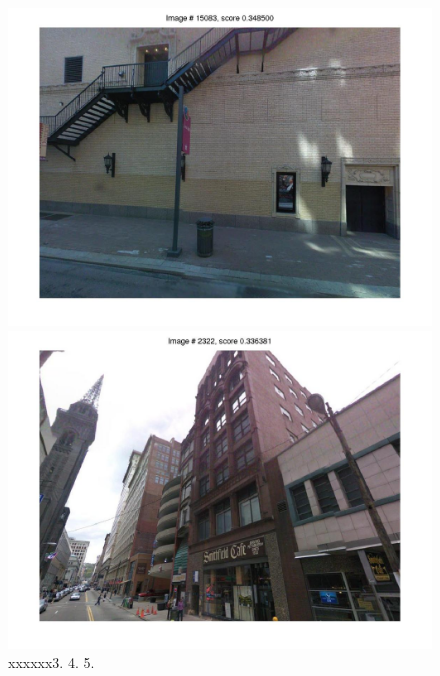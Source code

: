 \documentclass[10pt,onecolumn,A4]{article}
\begin{document}
\begin{figure}
\begin{minipage}{0.45\linewidth}
		\colorbox{myGreen}{\includegraphics[trim = 55mm 40mm 55mm 30mm, clip=true,width=0.30\linewidth]{sup2358/svm04.jpg}}
		\colorbox{myCopper5}{\includegraphics[trim = 55mm 40mm 55mm 30mm, clip=true,width=0.30\linewidth]{sup2358/svm05.jpg}}  \\
		\textcolor{myWhite}{xxxxxx}3. \hspace{0.25\linewidth}4. \hspace{0.25\linewidth}5. \\
	\end{minipage}
\end{figure}
\end{document}
